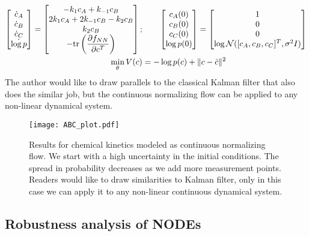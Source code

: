 \documentclass[fontsize=11pt]{article}
\newcommand{\norm}[1]{\lVert #1 \rVert}
\theoremstyle{definition}
\begin{document}
\begin{align}
    \begin{bmatrix} \dot{c}_A \\ \dot{c}_B \\ \dot{c}_C \\ \dot{\log p} \end{bmatrix}
    = \begin{bmatrix}
        -k_{1}c_A + k_{-1}c_B  \\
        2k_{1}c_A +  2k_{-1}c_B - k_2c_B \\
        k_{2}c_B\\
        -\mathrm{tr} \left(\dfrac{\partial f_{NN}}{\partial c^T}\right)
    \end{bmatrix};
    &\qquad
    \begin{bmatrix} c_A(0) \\ c_B(0) \\ c_C(0) \\ \log p(0) \end{bmatrix} =
    \begin{bmatrix} 1 \\ 0 \\ 0 \\ \log{\mathcal{N}([c_A, c_B, c_C]^T, \sigma^2I)} \end{bmatrix} \notag \\
    \min\limits_{\theta} V(c) &= -\log p(c) + \norm{c - \tilde{c}}^2
\end{align}
The author would like to draw parallels to the classical Kalman filter \citep{kalman:1960} that also does the similar job,
but the continuous normalizing flow can be applied to any non-linear dynamical system.
\begin{figure}[h]
    \centering
    \texttt{[image: ABC\_plot.pdf]} 
    \caption{Results for chemical kinetics modeled as continuous normalizing
    flow. We start with a high uncertainty in the initial conditions. The spread in 
    probability decreases as we add more measurement points. Readers would like
    to draw similarities to Kalman filter, only in this case we can apply it to 
    any non-linear continuous dynamical system.}
    \label{fig:cnf}
\end{figure}

\subsection{Robustness analysis of NODEs}
\end{document}
